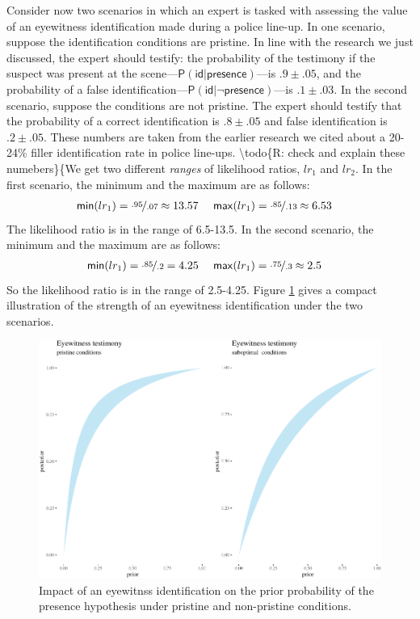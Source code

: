 \documentclass[
  10pt,
  dvipsnames,enabledeprecatedfontcommands]{scrartcl}
\newcommand{\pr}[1]{\mathsf{P}(#1)}
\begin{document}
Consider now two scenarios in which an expert is tasked with assessing
the value of an eyewitness identification made during a police line-up.
In one scenario, suppose the identification conditions are pristine. In
line with the research we just discussed, the expert should testify: the
probability of the testimony if the suspect was present at the
scene---\(\pr{\textsf{id} \vert \textsf{presence}}\)---is
\(.9 \pm .05\), and the probability of a false
identification---\(\pr{\textsf{id} \vert \neg \textsf{presence}}\)---is
\(.1\pm .03\). In the second scenario, suppose the conditions are not
pristine. The expert should testify that the probability of a correct
identification is \(.8 \pm .05\) and false identification is
\(.2 \pm .05\). These numbers are taken from the earlier research we
cited about a 20-24\% filler identification rate in police line-ups.
\textbackslash todo\{R: check and explain these numebers\}\{We get two
different \emph{ranges} of likelihood ratios, \(lr_1\) and \(lr_2\). In
the first scenario, the minimum and the maximum are as follows:
\begin{align*}
\mathsf{min}(lr_1) = \nicefrac{.95}{.07} \approx 13.57  & \,\,\,\,\,\,\,\,  \mathsf{max}(lr_1) = \nicefrac{.85}{.13} \approx 6.53  
\end{align*} \noindent The likelihood ratio is in the range of 6.5-13.5.
In the second scenario, the minimum and the maximum are as follows:
\begin{align*}
\mathsf{min}(lr_1) = \nicefrac{.85}{.2} =  4.25 &  \,\,\,\,\,\,\,\,   \mathsf{max}(lr_1) = \nicefrac{.75}{.3} \approx 2.5  
\end{align*} \noindent So the likelihood ratio is in the range of
2.5-4.25. Figure \ref{fig:eyewitness3b} gives a compact illustration of
the strength of an eyewitness identification under the two scenarios.

\begin{figure}[h]

\begin{center}\includegraphics[width=1\linewidth]{lr-chapter4_files/figure-latex/eyewitness2b-1} \end{center}
\caption{Impact of an eyewitnss identification on the prior probability of the presence hypothesis under pristine and non-pristine conditions.}
\label{fig:eyewitness3b}
\end{figure}
\end{document}
